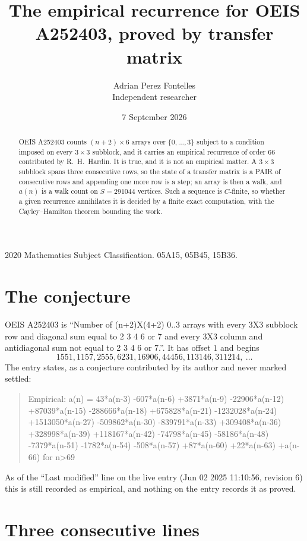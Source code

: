\documentclass[11pt,a4paper]{article}
\title{The empirical recurrence for OEIS A252403, proved by transfer matrix}
\author{Adrian Perez Fontelles\\ \small Independent researcher}
\date{7 September 2026}
\theoremstyle{plain}
\theoremstyle{definition}
\begin{document}
\maketitle

\begin{abstract}
OEIS A252403 counts $(n+2)\times6$ arrays over $\{0,\dots,3\}$ subject to a condition imposed on
every $3\times3$ subblock, and it carries an empirical recurrence of order $66$
contributed by R.~H.~Hardin. It is true, and it is not an empirical matter. A $3\times3$
subblock spans three consecutive rows, so the state of a transfer matrix is a PAIR of
consecutive rows and appending one more row is a step; an array is then a walk, and
$a(n)$ is a walk count on $S=291044$ vertices. Such a sequence is $C$-finite, so whether a given
recurrence annihilates it is decided by a finite exact computation, with the Cayley--Hamilton
theorem bounding the work.
\end{abstract}

\noindent\small 2020 Mathematics Subject Classification. 05A15, 05B45, 15B36.\normalsize

\section{The conjecture}

OEIS A252403 is ``Number of (n+2)X(4+2) 0..3 arrays with every 3X3 subblock row and diagonal sum equal to 2 3 4 6 or 7 and every 3X3 column and antidiagonal sum not equal to 2 3 4 6 or 7.''. It has offset $1$ and begins
\[
1551, 1157, 2555, 6231, 16906, 44456, 113146, 311214,\ \dots
\]
The entry states, as a conjecture contributed by its author and never marked settled:
\begin{quote}
Empirical: a(n) = 43*a(n-3) -607*a(n-6) +3871*a(n-9) -22906*a(n-12) +87039*a(n-15) -288666*a(n-18) +675828*a(n-21) -1232028*a(n-24) +1513050*a(n-27) -509862*a(n-30) -839791*a(n-33) +309408*a(n-36) +328998*a(n-39) +118167*a(n-42) -74798*a(n-45) -58186*a(n-48) -7379*a(n-51) -1782*a(n-54) -508*a(n-57) +87*a(n-60) +22*a(n-63) +a(n-66) for n>69
\end{quote}
As of the ``Last modified'' line on the live entry (Jun 02 2025 11:10:56, revision 6) this is still
recorded as empirical, and nothing on the entry records it as proved.

\section{Three consecutive lines}
\end{document}
